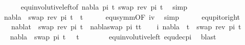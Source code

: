 \begin{isabellebody}
\ \ \ \ \isamarkupfalse%
\ equ{\isacharunderscore}{\kern0pt}involutive{\isacharunderscore}{\kern0pt}left{\isacharbrackleft}{\kern0pt}of\ nabla\ pi\ t{}\ {\isacartoucheopen}swap\ {\isacharparenleft}{\kern0pt}rev\ pi{\isacharparenright}{\kern0pt}\ t{}{\isacartoucheclose}{\isacharbrackright}{\kern0pt}\ \isamarkupfalse%
\ simp\isanewline
\ \ \isamarkupfalse%
\ \isamarkupfalse%
\ {\isachardoublequoteopen}nabla\ {\isasymturnstile}\ swap\ {\isacharparenleft}{\kern0pt}rev\ pi{\isacharparenright}{\kern0pt}\ t{}\ {\isasymapprox}\ t{}{\isachardoublequoteclose}\isanewline
\ \ \ \ \isamarkupfalse%
\ equ{\isacharunderscore}{\kern0pt}symm{\isacharbrackleft}{\kern0pt}OF\ iv{\isacharbrackright}{\kern0pt}\ \isamarkupfalse%
\ simp\isakeywordONE{{\isacharbraceright}{\kern0pt}}\isamarkupfalse%
\isanewline
\isanewline
{}\isamarkupfalse%
%
\endisatagproof
{\isafoldproof}%
%
\isadelimproof
\isanewline
%
\endisadelimproof
\ \ \ \ \isanewline
{}\isamarkupfalse%
\ equ{\isacharunderscore}{\kern0pt}pi{\isacharunderscore}{\kern0pt}to{\isacharunderscore}{\kern0pt}right{\isacharcolon}{\kern0pt}\ \isanewline
\ \ \ {\isachardoublequoteopen}nabla{\isasymturnstile}t{}\ {\isasymapprox}\ swap\ {\isacharparenleft}{\kern0pt}rev\ pi{\isacharparenright}{\kern0pt}\ t{}\ {\isacharequal}{\kern0pt}\ nabla{\isasymturnstile}swap\ pi\ t{}{\isasymapprox}t{}{\isachardoublequoteclose}\isanewline
%
\isadelimproof
%
\endisadelimproof
%
\isatagproof
{}\isamarkupfalse%
\isanewline
\ \ \isakeywordONE{{\isacharbraceleft}{\kern0pt}}\isamarkupfalse%
\isamarkupfalse%
\ i{\isacharcolon}{\kern0pt}\ {\isachardoublequoteopen}nabla\ {\isasymturnstile}\ t{}\ {\isasymapprox}\ swap\ {\isacharparenleft}{\kern0pt}rev\ pi{\isacharparenright}{\kern0pt}\ t{}{\isachardoublequoteclose}\isanewline
\ \ \ \ \isamarkupfalse%
\ \isamarkupfalse%
\ {\isachardoublequoteopen}nabla\ {\isasymturnstile}\ swap\ pi\ t{}\ {\isasymapprox}\ \ t{}{\isachardoublequoteclose}\isanewline
\ \ \ \ \ \ \isamarkupfalse%
\ equ{\isacharunderscore}{\kern0pt}involutive{\isacharunderscore}{\kern0pt}left\ equ{\isacharunderscore}{\kern0pt}dec{\isacharunderscore}{\kern0pt}pi\ \isamarkupfalse%
\ blast\isakeywordONE{{\isacharbraceright}{\kern0pt}}\isamarkupfalse%

\end{isabellebody}
